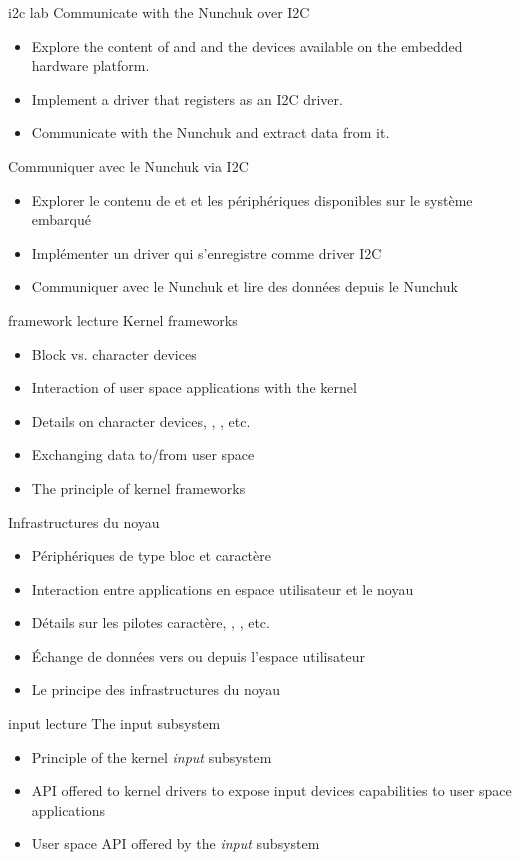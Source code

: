 {i2c}
{lab}
{Communicate with the Nunchuk over I2C}
{
  \begin{itemize}
  \item Explore the content of  and  and the
    devices available on the embedded hardware platform.
  \item Implement a driver that registers as an I2C driver.
  \item Communicate with the Nunchuk and extract data from it.
  \end{itemize}
}
{Communiquer avec le Nunchuk via I2C}
{
  \begin{itemize}
  \item Explorer le contenu de  et  et les
    périphériques disponibles sur le système embarqué
  \item Implémenter un driver qui s'enregistre comme driver I2C
  \item Communiquer avec le Nunchuk et lire des données depuis le
    Nunchuk
  \end{itemize}
}
{framework}
{lecture}
{Kernel frameworks}
{
  \begin{itemize}
  \item Block vs. character devices
  \item Interaction of user space applications with the kernel
  \item Details on character devices, , , etc.
  \item Exchanging data to/from user space
  \item The principle of kernel frameworks
  \end{itemize}
}
{Infrastructures du noyau}
{
  \begin{itemize}
  \item Périphériques de type bloc et caractère
  \item Interaction entre applications en espace utilisateur et le noyau
  \item Détails sur les pilotes caractère,  ,
    , etc.
  \item Échange de données vers ou depuis l'espace utilisateur
  \item Le principe des infrastructures du noyau
  \end{itemize}
}
{input}
{lecture}
{The input subsystem}
{
  \begin{itemize}
  \item Principle of the kernel {\em input} subsystem
  \item API offered to kernel drivers to expose input devices
    capabilities to user space applications
  \item User space API offered by the {\em input} subsystem
  \end{itemize}
}
